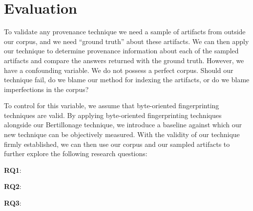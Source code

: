 
\section{Evaluation}\label{sec:evaluation}

\label{sec:method}

To validate any provenance technique we need a sample of artifacts from
outside our corpus, and we need ``ground truth'' about these artifacts.  We
can then apply our technique to determine provenance information about each
of the sampled artifacts and compare the answers returned with the ground
truth.  However, we have a confounding variable.  We do not possess a
perfect corpus.  Should our technique fail, do we blame our method for
indexing the artifacts, or do we blame imperfections in the corpus?

To control for this variable, we assume that byte-oriented fingerprinting
techniques are valid.  By applying byte-oriented fingerprinting techniques
alongside our Bertillonage technique, we introduce a baseline against which
our new technique can be objectively measured.  With the validity of our
technique firmly established, we can then use our corpus and our sampled
artifacts to further explore the following research questions:



\vspace{0.7em}

\textbf{RQ1}: \textbf{\rqOne}


\vspace{0.7em}

\textbf{RQ2}: \textbf{\rqTwo}


\vspace{0.7em}

\textbf{RQ3}: \textbf{\rqThree}





